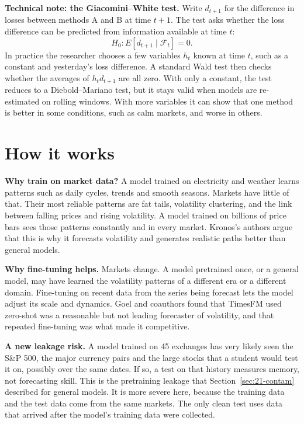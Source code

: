 \begin{technote}
\textbf{Technical note: the Giacomini--White test.} Write $d_{t+1}$ for the difference in losses between methods A and B at time $t+1$. The test asks whether the loss difference can be predicted from information available at time $t$:
\begin{equation}
  H_0: E\left[d_{t+1} \mid \mathcal{F}_t\right] = 0.
  \label{eq:23-gw}
\end{equation}
In practice the researcher chooses a few variables $h_t$ known at time $t$, such as a constant and yesterday's loss difference. A standard Wald test then checks whether the averages of $h_t d_{t+1}$ are all zero. With only a constant, the test reduces to a Diebold--Mariano test, but it stays valid when models are re-estimated on rolling windows. With more variables it can show that one method is better in some conditions, such as calm markets, and worse in others.
\end{technote}

\section{How it works}
\label{sec:23-how}

\textbf{Why train on market data?} A model trained on electricity and weather learns patterns such as daily cycles, trends and smooth seasons. Markets have little of that. Their most reliable patterns are fat tails, volatility clustering, and the link between falling prices and rising volatility. A model trained on billions of price bars sees those patterns constantly and in every market. Kronos's authors argue that this is why it forecasts volatility and generates realistic paths better than general models.

\textbf{Why fine-tuning helps.} Markets change. A model pretrained once, or a general model, may have learned the volatility patterns of a different era or a different domain. Fine-tuning on recent data from the series being forecast lets the model adjust its scale and dynamics. Goel and coauthors found that TimesFM used zero-shot was a reasonable but not leading forecaster of volatility, and that repeated fine-tuning was what made it competitive.

\textbf{A new leakage risk.} A model trained on 45 exchanges has very likely seen the S\&P 500, the major currency pairs and the large stocks that a student would test it on, possibly over the same dates. If so, a test on that history measures memory, not forecasting skill. This is the pretraining leakage that Section~\ref{sec:21-contam} described for general models. It is more severe here, because the training data and the test data come from the same markets. The only clean test uses data that arrived after the model's training data were collected.

